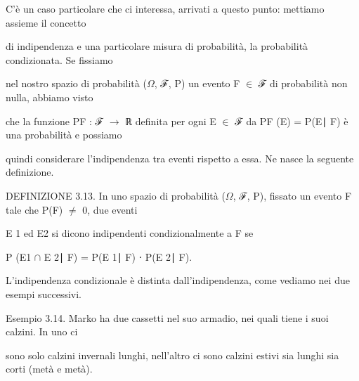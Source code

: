 \documentclass[a4paper,portrait,12pt]{article}
\begin{document}
\begin{flushleft}
C'\`{e} un caso particolare che ci interessa, arrivati a questo punto: mettiamo assieme il concetto
\end{flushleft}


\begin{flushleft}
di indipendenza e una particolare misura di probabilit\`{a}, la probabilit\`{a} condizionata. Se fissiamo
\end{flushleft}


\begin{flushleft}
nel nostro spazio di probabilit\`{a} ($\Omega$, ℱ, P) un evento F $\in$ ℱ di probabilit\`{a} non nulla, abbiamo visto
\end{flushleft}


\begin{flushleft}
che la funzione PF : ℱ $\rightarrow$ ℝ definita per ogni E $\in$ ℱ da PF (E) = P(E∣ F) \`{e} una probabilit\`{a} e possiamo
\end{flushleft}


\begin{flushleft}
quindi considerare l'indipendenza tra eventi rispetto a essa. Ne nasce la seguente definizione.
\end{flushleft}


\begin{flushleft}
DEFINIZIONE 3.13. In uno spazio di probabilit\`{a} ($\Omega$, ℱ, P), fissato un evento F tale che P(F) $\neq$ 0, due eventi
\end{flushleft}


\begin{flushleft}
E 1 ed E2 si dicono indipendenti condizionalmente a F se
\end{flushleft}


\begin{flushleft}
P (E1 $\cap$ E 2∣ F) = P(E 1∣ F) ⋅ P(E 2∣ F).
\end{flushleft}


\begin{flushleft}
L'indipendenza condizionale \`{e} distinta dall'indipendenza, come vediamo nei due esempi successivi.
\end{flushleft}


\begin{flushleft}
Esempio 3.14. Marko ha due cassetti nel suo armadio, nei quali tiene i suoi calzini. In uno ci
\end{flushleft}


\begin{flushleft}
sono solo calzini invernali lunghi, nell'altro ci sono calzini estivi sia lunghi sia corti (met\`{a} e met\`{a}).
\end{flushleft}
\end{document}
